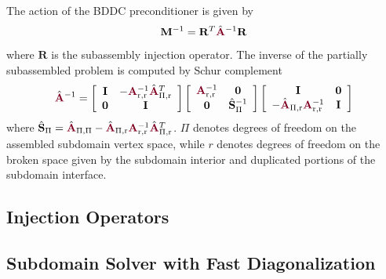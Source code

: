 \begin{definition}
The action of the BDDC preconditioner is given by
\begin{equation}
\mathbf{M}^{-1} = \mathbf{R}^T \hat{\color{burgundy}\mathbf{A}}^{-1} \mathbf{R}
\end{equation}
where $\mathbf{R}$ is the subassembly injection operator.
The inverse of the partially subassembled problem is computed by Schur complement
\begin{equation}
\hat{\color{burgundy}\mathbf{A}}^{-1} =
\left[ \begin{array}{c c}
\mathbf{I}  &  -{\color{burgundy}\mathbf{A}}_{\text{r}, \text{r}}^{-1} \hat{\color{burgundy}\mathbf{A}}_{\Pi, \text{r}}^T  \\
\mathbf{0}  &  \mathbf{I}                                                                                                  \\
\end{array} \right]
\left[ \begin{array}{c c}
{\color{burgundy}\mathbf{A}}_{\text{r}, \text{r}}^{-1}  &  \mathbf{0}                   \\
\mathbf{0}                                              &  \hat{\mathbf{S}}_{\Pi}^{-1}  \\
\end{array} \right]
\left[ \begin{array}{c c}
\mathbf{I}                                                                                                &  \mathbf{0}  \\
-\hat{\color{burgundy}\mathbf{A}}_{\Pi, \text{r}} {\color{burgundy}\mathbf{A}}_{\text{r}, \text{r}}^{-1}  &  \mathbf{I}  \\
\end{array} \right]
\end{equation}
where $\hat{\mathbf{S}}_{\Pi} = \hat{\color{burgundy}\mathbf{A}}_{\Pi, \Pi} - \hat{\color{burgundy}\mathbf{A}}_{\Pi, \text{r}} {\color{burgundy}\mathbf{A}}_{\text{r}, \text{r}}^{-1} \hat{\color{burgundy}\mathbf{A}}_{\Pi, \text{r}}^T$.
$\Pi$ denotes degrees of freedom on the assembled subdomain vertex space, while $r$ denotes degrees of freedom on the broken space given by the subdomain interior and duplicated portions of the subdomain interface.
\label{def:bddcpreconditioner}
\end{definition}

\subsection{Injection Operators}


\subsection{Subdomain Solver with Fast Diagonalization}\label{sec:fdm_subdomain}

